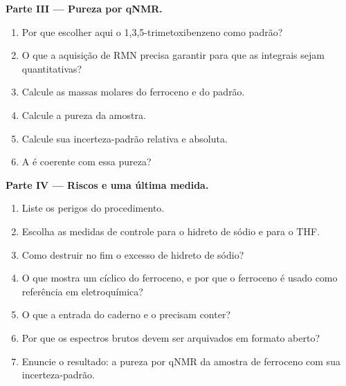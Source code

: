 \begin{problem}
\medskip\noindent\textbf{Parte III --- Pureza por qNMR.}
\begin{enumerate}[resume]
  \item Por que escolher aqui o 1,3,5-trimetoxibenzeno como padrão?
  \item O que a aquisição de RMN precisa garantir para que as integrais sejam quantitativas?
  \item Calcule as massas molares do ferroceno e do padrão.
  \item Calcule a pureza da amostra.
  \item Calcule sua incerteza-padrão relativa e absoluta.
  \item A  é coerente com essa pureza?
\end{enumerate}

\medskip\noindent\textbf{Parte IV --- Riscos e uma última medida.}
\begin{enumerate}[resume]
  \item Liste os perigos do procedimento.
  \item Escolha as medidas de controle para o hidreto de sódio e para o THF.
  \item Como destruir no fim o excesso de hidreto de sódio?
  \item O que mostra um  cíclico do ferroceno, e por que o ferroceno é usado
        como referência em eletroquímica?
  \item O que a entrada do caderno e o  precisam conter?
  \item Por que os espectros brutos devem ser arquivados em formato aberto?
  \item Enuncie o resultado: a pureza por qNMR da amostra de ferroceno com sua
        incerteza-padrão.
\end{enumerate}
\end{problem}
